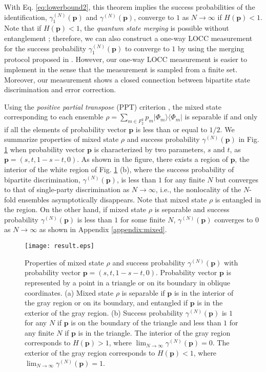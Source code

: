 \documentclass[aps,prx,twocolumn,showpacs,amsmath,notitlepage,amssymb,superscriptaddress]{revtex4-1}
\newcommand{\bra}[1]{\langle {#1} |}
\newcommand{\ket}[1]{| {#1} \rangle}
\begin{document}
With Eq. \eqref{eq:lowerbound2}, this theorem implies the success probabilities of the identification, $\gamma_1^{(N)}(\mathbf{p})$ and $\gamma^{(N)}(\mathbf{p})$, converge to $1$ as $N\rightarrow\infty$ if $H(\mathbf{p})<1$. Note that if $H(\mathbf{p})<1$, the {\it quantum state merging} is possible without entanglement \cite{merging}; therefore, we can also construct a one-way LOCC measurement for the success probability $\gamma_1^{(N)}(\mathbf{p})$ to converge to $1$ by using the merging protocol proposed in \cite{merging}. However, our one-way LOCC measurement is easier to implement in the sense that the measurement is sampled from a finite set. Moreover, our measurement shows a closed connection between bipartite state discrimination and error correction.


Using the {\it positive partial transpose} (PPT) criterion \cite{PPT}, the mixed state corresponding to each ensemble $\rho=\sum_{m\in F_2^2}p_m\ket{\Phi_m}\bra{\Phi_m}$ is separable if and only if all the elements of probability vector $\mathbf{p}$ is less than or equal to $1/2$. We summarize properties of mixed state $\rho$ and success probability $\gamma^{(N)}(\mathbf{p})$ in Fig. \ref{fig:result} when probability vector $\mathbf{p}$ is characterized by two parameters, $s$ and $t$, as $\mathbf{p}=(s,t,1-s-t,0)$. As shown in the figure, there exists a region of $\mathbf{p}$, the interior of the white region of Fig. \ref{fig:result} (b), where the success probability of bipartite discrimination, $\gamma^{(N)}(\mathbf{p})$, is less than $1$ for any finite $N$ but converges to that of single-party discrimination as $N\rightarrow \infty$, i.e., the nonlocality of the $N$-fold ensembles asymptotically disappears. Note that mixed state $\rho$ is entangled in the region. On the other hand, if mixed state $\rho$ is separable and success probability $\gamma^{(N)}(\mathbf{p})$ is less than $1$ for some finite $N$, $\gamma^{(N)}(\mathbf{p})$ converges to $0$ as $N\rightarrow \infty$ as shown in Appendix \ref{appendix:mixed}.

\begin{figure}
 \centering
  \texttt{[image: result.eps]}
  \caption{Properties of mixed state $\rho$ and success probability $\gamma^{(N)}(\mathbf{p})$ with probability vector $\mathbf{p}=(s,t,1-s-t,0)$. Probability vector $\mathbf{p}$ is represented by a point in a triangle or on its boundary in oblique coordinates. (a) Mixed state $\rho$ is separable if $\mathbf{p}$ is in the interior of the gray region or on its boundary, and entangled if $\mathbf{p}$ is in the exterior of the gray region. (b) Success probability $\gamma^{(N)}(\mathbf{p})$ is $1$ for any $N$ if $\mathbf{p}$ is on the boundary of the triangle and less than $1$ for any finite $N$ if $\mathbf{p}$ is in the triangle. The interior of the gray region corresponds to $H(\mathbf{p})>1$, where $\lim_{N\rightarrow\infty}\gamma^{(N)}(\mathbf{p})=0$. The exterior of the gray region corresponds to $H(\mathbf{p})<1$, where $\lim_{N\rightarrow\infty}\gamma^{(N)}(\mathbf{p})=1$.}
\label{fig:result}
\end{figure} 
\end{document}
